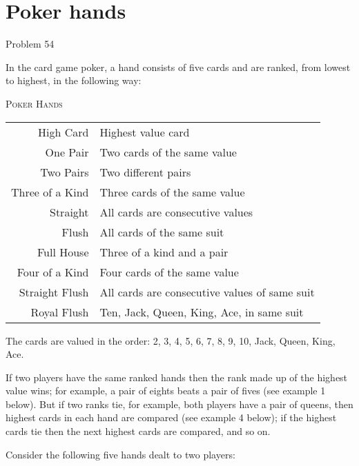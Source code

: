 \section{Poker hands}
Problem 54

In the card game poker, a hand consists of five cards and are ranked, from lowest to highest, in the following way:

\noindent
\begin{tablebox}{\textsc{Poker Hands}}
	{
		\color{black!70} \sffamily
		\begin{tabularx}{\textwidth}{rX}
			High Card       & Highest value card                            \\
			One Pair        & Two cards of the same value                   \\
			Two Pairs       & Two different pairs                           \\
			Three of a Kind & Three cards of the same value                 \\
			Straight        & All cards are consecutive values              \\
			Flush           & All cards of the same suit                    \\
			Full House      & Three of a kind and a pair                    \\
			Four of a Kind  & Four cards of the same value                  \\
			Straight Flush  & All cards are consecutive values of same suit \\
			Royal Flush     & Ten, Jack, Queen, King, Ace, in same suit     \\
		\end{tabularx}
	}
\end{tablebox}

The cards are valued in the order:
2, 3, 4, 5, 6, 7, 8, 9, 10, Jack, Queen, King, Ace.

If two players have the same ranked hands then the rank made up of the highest value wins; for example, a pair of eights
beats a pair of fives (see example 1 below). But if two ranks tie, for example, both players have a pair of queens, then
highest cards in each hand are compared (see example 4 below); if the highest cards tie then the next highest cards are
compared, and so on.

Consider the following five hands dealt to two players:

